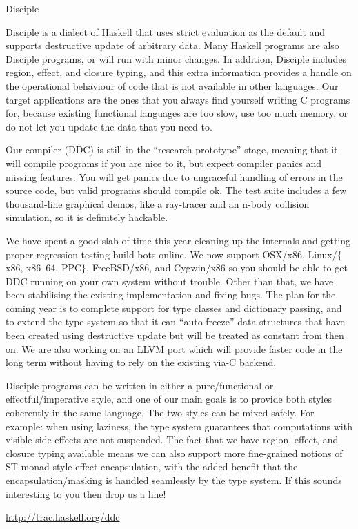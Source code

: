 \begin{hcarentry}{Disciple}
\makeheader

Disciple is a dialect of Haskell that uses strict evaluation as the default and supports destructive update of arbitrary data.  Many Haskell programs are also Disciple programs, or will run with minor changes. In addition, Disciple includes region, effect, and closure typing, and this extra information provides a handle on the operational behaviour of code that is not available in other languages. Our target applications are the ones that you always find yourself writing C programs for, because existing functional languages are too slow, use too much memory, or do not let you update the data that you need to.

Our compiler (DDC) is still in the ``research prototype'' stage, meaning that it will compile programs if you are nice to it, but expect compiler panics and missing features. You will get panics due to ungraceful handling of errors in the source code, but valid programs should compile ok. The test suite includes a few thousand-line graphical demos, like a ray-tracer and an n-body collision simulation, so it is definitely hackable.

We have spent a good slab of time this year cleaning up the internals and getting proper regression testing build bots online. We now support OSX/x86, Linux/$\{$x86, x86--64, PPC$\}$, FreeBSD/x86, and Cygwin/x86 so you should be able to get DDC running on your own system without trouble. Other than that, we have been stabilising the existing implementation and fixing bugs. The plan for the coming year is to complete support for type classes and dictionary passing, and to extend the type system so that it can ``auto-freeze'' data structures that have been created using destructive update but will be treated as constant from then on. We are also working on an LLVM port which will provide faster code in the long term without having to rely on the existing via-C backend.

Disciple programs can be written in either a pure/functional or effectful/imperative style, and one of our main goals is to provide both styles coherently in the same language. The two styles can be mixed safely. For example: when using laziness, the type system guarantees that computations with visible side effects are not suspended. The fact that we have region, effect, and closure typing available means we can also support more fine-grained notions of ST-monad style effect encapsulation, with the added benefit that the encapsulation/masking is handled seamlessly by the type system. If this sounds interesting to you then drop us a line!

\FurtherReading
  \url{http://trac.haskell.org/ddc}
\end{hcarentry}
